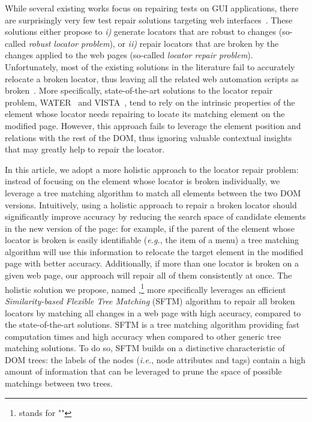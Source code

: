 \documentclass[preprint, 12pt]{elsarticle}
\begin{document}
While several existing works focus on repairing tests on GUI applications, there are surprisingly very few test repair solutions targeting web interfaces~\cite{imtiaz2019systematic}.
These solutions either propose to \emph{i)} generate locators that are robust to changes (so-called \emph{robust locator problem}), or \emph{ii)} repair locators that are broken by the changes applied to the web pages (so-called \emph{locator repair problem}).
Unfortunately, most of the existing solutions in the literature fail to accurately relocate a broken locator, thus leaving all the related web automation scripts as broken~\cite{hammoudi2016record}.
% 
More specifically, state-of-the-art solutions to the locator repair problem, WATER~\cite{choudhary2011water} and VISTA~\cite{stocco2018visual}, tend to rely on the intrinsic properties of the element whose locator needs repairing to locate its matching element on the modified page. 
However, this approach fails to leverage the element position and relations with the rest of the DOM, thus ignoring valuable contextual insights that may greatly help to repair the locator.

In this article, we adopt a more holistic approach to the locator repair problem: instead of focusing on the element whose locator is broken individually, we leverage a tree matching algorithm to match all elements between the two DOM versions. 
Intuitively, using a holistic approach to repair a broken locator should significantly improve accuracy by reducing the search space of candidate elements in the new version of the page: for example, if the parent of the element whose locator is broken is easily identifiable (\emph{e.g.}, the item of a menu) a tree matching algorithm will use this information to relocate the target element in the modified page with better accuracy.
Additionally, if more than one locator is broken on a given web page, our approach will repair all of them consistently at once.
The holistic solution we propose, named \erratum{},\footnote{\erratum{} stands for "\erratumlong{}"} more specifically leverages an efficient \emph{Similarity-based Flexible Tree Matching} (SFTM) algorithm to repair all broken locators by matching all changes in a web page with high accuracy, compared to the state-of-the-art solutions.
SFTM is a tree matching algorithm providing fast computation times and high accuracy when compared to other generic tree matching solutions.
To do so, SFTM builds on a distinctive characteristic of DOM trees: the labels of the nodes (\emph{i.e.}, node attributes and tags) contain a high amount of information that can be leveraged to prune the space of possible matchings between two trees.
\end{document}
